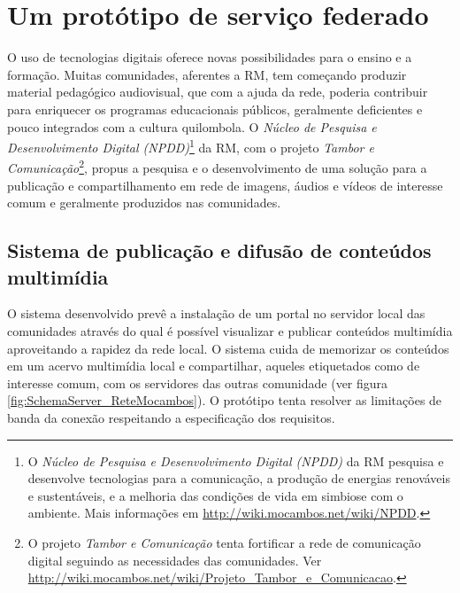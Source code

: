 
\chapter{Um protótipo de serviço federado}
\label{Capitulo4}

O uso de tecnologias digitais oferece novas possibilidades para o
ensino e a formação. Muitas comunidades, aferentes a RM, tem começando
produzir material pedagógico audiovisual, que com a ajuda da rede,
poderia contribuir para enriquecer os programas educacionais públicos,
geralmente deficientes e pouco integrados com a cultura quilombola. O
\emph{Núcleo de Pesquisa e Desenvolvimento Digital (NPDD)}\footnote{O
  \emph{Núcleo de Pesquisa e Desenvolvimento Digital (NPDD)} da RM
  pesquisa e desenvolve tecnologias para a comunicação, a produção de
  energias renováveis e sustentáveis, e a melhoria das condições de
  vida em simbiose com o ambiente. Mais informações em
  \url{http://wiki.mocambos.net/wiki/NPDD}.} da RM, com o projeto
\emph{Tambor e Comunicação}\footnote{O projeto \emph{Tambor e
    Comunicação} tenta fortificar a rede de comunicação digital
  seguindo as necessidades das comunidades. Ver
  \url{http://wiki.mocambos.net/wiki/Projeto_Tambor_e_Comunicacao}.},
propus a pesquisa e o desenvolvimento de uma solução para a publicação
e compartilhamento em rede de imagens, áudios e vídeos de interesse
comum e geralmente produzidos nas comunidades. 

\section{Sistema de publicação e difusão de conteúdos multimídia}
O sistema desenvolvido prevê a instalação de um portal no servidor
local das comunidades através do qual é possível visualizar e publicar
conteúdos multimídia aproveitando a rapidez da rede local. O sistema
cuida de memorizar os conteúdos em um acervo multimídia local e
compartilhar, aqueles etiquetados como de interesse comum, com os
servidores das outras comunidade (ver figura
\ref{fig:SchemaServer_ReteMocambos}). O protótipo tenta resolver as
limitações de banda da conexão respeitando a especificação dos
requisitos.

